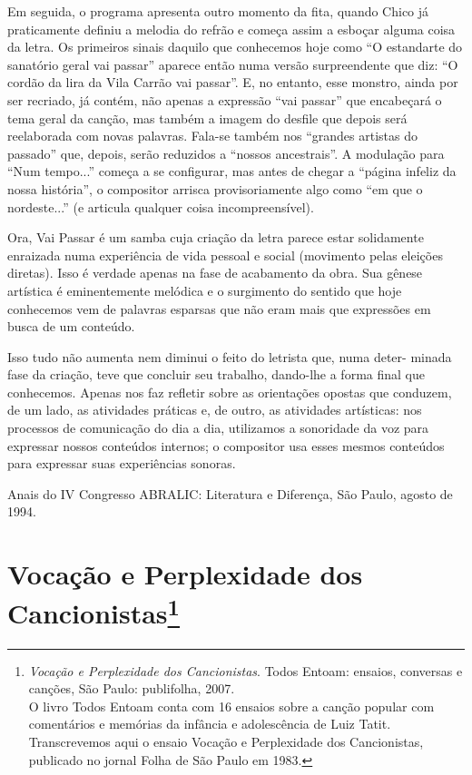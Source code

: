 Em seguida, o programa apresenta outro momento da fita, quando Chico já
praticamente definiu a melodia do refrão e começa assim a esboçar alguma
coisa da letra. Os primeiros sinais daquilo que conhecemos hoje como ``O
estandarte do sanatório geral vai passar'' aparece então numa versão
surpreendente que diz: ``O cordão da lira da Vila Carrão vai passar''.
E, no entanto, esse monstro, ainda por ser recriado, já contém, não
apenas a expressão ``vai passar'' que encabeçará o tema geral da canção,
mas também a imagem do desfile que depois será reelaborada com novas
palavras. Fala-se também nos ``grandes artistas do passado'' que,
depois, serão reduzidos a ``nossos ancestrais''. A modulação para ``Num
tempo...'' começa a se configurar, mas antes de chegar a ``página
infeliz da nossa história'', o compositor arrisca provisoriamente algo
como ``em que o nordeste...'' (e articula qualquer coisa
incompreensível).

Ora, Vai Passar é um samba cuja criação da letra parece estar
solidamente enraizada numa experiência de vida pessoal e social
(movimento pelas eleições diretas). Isso é verdade apenas na fase de
acabamento da obra. Sua gênese artística é eminentemente melódica e o
surgimento do sentido que hoje conhecemos vem de palavras esparsas que
não eram mais que expressões em busca de um conteúdo.

Isso tudo não aumenta nem diminui o feito do letrista que, numa deter-
minada fase da criação, teve que concluir seu trabalho, dando-lhe a
forma final que conhecemos. Apenas nos faz refletir sobre as orientações
opostas que conduzem, de um lado, as atividades práticas e, de outro, as
atividades artísticas: nos processos de comunicação do dia a dia,
utilizamos a sonoridade da voz para expressar nossos conteúdos internos;
o compositor usa esses mesmos conteúdos para expressar suas experiências
sonoras.

Anais do IV Congresso ABRALIC: Literatura e Diferença, São Paulo, agosto
de 1994.

\chapter{Vocação e Perplexidade dos Cancionistas\footnote{\emph{Vocação e Perplexidade dos Cancionistas}. Todos Entoam: ensaios,
conversas e canções, São Paulo: publifolha, 2007.\\
O livro Todos Entoam conta com 16 ensaios sobre a canção
popular com comentários e memórias da infância e adolescência de Luiz
Tatit. Transcrevemos aqui o ensaio Vocação e Perplexidade dos
Cancionistas, publicado no jornal Folha de São Paulo em 1983.}}


